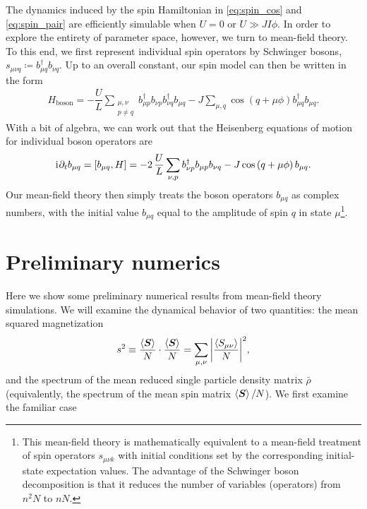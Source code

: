 \documentclass[nofootinbib,notitlepage,11pt]{revtex4-2}
\renewcommand{\t}{\text} %
\newcommand{\f}[2]{\dfrac{#1}{#2}} %
\newcommand{\p}[1]{\left(#1\right)} %
\renewcommand{\sp}[1]{\left[#1\right]} %
\newcommand{\bk}{\Braket} %
\renewcommand{\v}{\bm} %
\renewcommand{\c}{\cdot} %
\renewcommand{\d}{\partial} %
\renewcommand{\i}{\mathrm{i}\mkern1mu} %
\newcommand{\1}{\mathds{1}}
\begin{document}
The dynamics induced by the spin Hamiltonian in \eqref{eq:spin_cos} and \eqref{eq:spin_pair} are efficiently simulable when $U=0$ or $U\gg JI\phi$.
In order to explore the entirety of parameter space, however, we turn to mean-field theory.
To this end, we first represent individual spin operators by Schwinger bosons, $s_{\mu\nu q}\coloneqq b_{\mu q}^\dag b_{\nu q}$.
Up to an overall constant, our spin model can then be written in the form
\begin{align}
  H_{\t{boson}} = - \f{U}{L} \sum_{\substack{\mu,\nu\\p\ne q}}
  b_{\mu p}^\dag b_{\nu p} b_{\nu q}^\dag b_{\mu q}
  - J \sum_{\mu,q} \cos\p{q+\mu\phi} b_{\mu q}^\dag b_{\mu q}.
\end{align}
With a bit of algebra, we can work out that the Heisenberg equations of motion for individual boson operators are
\begin{align}
  \i \d_t b_{\mu q} = \sp{b_{\mu q},H}
  = -2\, \f{U}{L} \sum_{\nu,p} b_{\nu p}^\dag b_{\mu p} b_{\nu q}
  - J \cos\p{q+\mu\phi} b_{\mu q}.
\end{align}
Our mean-field theory then simply treats the boson operators $b_{\mu q}$ as complex numbers, with the initial value $b_{\mu q}$ equal to the amplitude of spin $q$ in state $\mu$\footnote{This mean-field theory is mathematically equivalent to a mean-field treatment of spin operators $s_{\mu\nu k}$ with initial conditions set by the corresponding initial-state expectation values.  The advantage of the Schwinger boson decomposition is that it reduces the number of variables (operators) from $n^2 N$ to $nN$.}.

\section{Preliminary numerics}

Here we show some preliminary numerical results from mean-field theory simulations.
We will examine the dynamical behavior of two quantities: the mean squared magnetization
\begin{align}
  s^2 \equiv \f{\bk{\v S}}{N}\c\f{\bk{\v S}}{N}
  = \sum_{\mu,\nu} \abs{\f{\bk{S_{\mu\nu}}}{N}}^2,
\end{align}
and the spectrum of the mean reduced single particle density matrix $\bar\rho$ (equivalently, the spectrum of the mean spin matrix $\bk{\v S}/N$).
We first examine the familiar case

\newpage
\appendix
\end{document}
